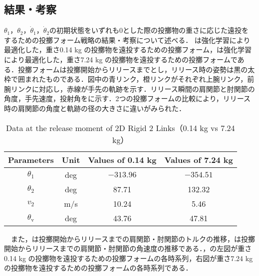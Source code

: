 \subsection{結果・考察}
$\theta_{1}$，$\theta_{2}$，$\dot{\theta}_{1}$，$\dot{\theta}_{2}$の初期状態をいずれも0とした際の投擲物の重さに応じた遠投をするための投擲フォーム戦略の結果・考察について述べる．
は強化学習により最適化した，重さ0.14 kg の投擲物を遠投するための投擲フォーム，は強化学習により最適化した，重さ7.24 kg の投擲物を遠投するための投擲フォームである．投擲フォームは投擲開始からリリースまでとし，リリース時の姿勢は黒の太枠で囲まれたものである．図中の青リンク，橙リンクがそれぞれ上腕リンク，前腕リンクに対応し，赤線が手先の軌跡を示す．リリース瞬間の肩関節と肘関節の角度，手先速度，投射角をに示す．2つの投擲フォームの比較により，リリース時の肩関節の角度と軌跡の径の大きさに違いがみられた．\\
\begin{table}[tb]
  \begin{center}
    \caption{Data at the release moment of 2D Rigid 2 Links（0.14 kg vs 7.24 kg）}
    \begin{tabular}{c|c|c|c}
      \hline
      Parameters & Unit & Values of 0.14 kg & Values of 7.24 kg \\
      \hline
      $\theta_{1}$ & deg & $-313.96$ & $-354.51$ \\
      $\theta_{2}$ & deg & 87.71 & 132.32 \\
      $v_{2}$ & m/s & 10.24 & 5.46 \\
      $\theta_{\mathrm{v}}$ & deg & 43.76 & 47.81 \\
      \hline
    \end{tabular}
  \end{center}
\end{table}
　また，は投擲開始からリリースまでの肩関節・肘関節のトルクの推移，は投擲開始からリリースまでの肩関節・肘関節の角速度の推移である．，の左図が重さ0.14 kg の投擲物を遠投するための投擲フォームの各時系列，右図が重さ7.24 kg の投擲物を遠投するための投擲フォームの各時系列である．\\
